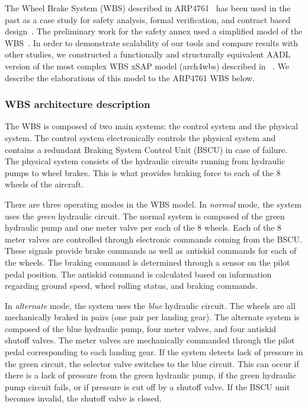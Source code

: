 The Wheel Brake System (WBS) described in ARP4761~\cite{SAE:ARP4761} has been used in the past as a case study for safety analysis, formal verification, and contract based design~\cite{DBLP:conf/cav/BozzanoCPJKPRT15, 10.1007/978-3-319-11936-6-7, CAV2015:BoCiGrMa, Stewart17:IMBSA, Joshi05:SafeComp}. The preliminary work for the safety annex used a simplified model of the WBS~\cite{Stewart17:IMBSA}. In order to demonstrate scalability of our tools and compare results with other studies, we constructed a functionally and structurally equivalent AADL version of %
the most complex WBS xSAP model (arch4wbs) described in %
~\cite{DBLP:conf/cav/BozzanoCPJKPRT15}.  %
We describe the elaborations of this model to the ARP4761 WBS below.

\subsubsection{WBS architecture description}
The WBS is composed of two main systems: the control system and the physical system. The control system electronically controls the physical system and contains a redundant Braking System Control Unit (BSCU) in case of failure. The physical system consists of the hydraulic circuits running from hydraulic pumps to wheel brakes. This is what provides braking force to each of the 8 wheels of the aircraft.

There are three operating modes in the WBS model. In \textit{normal} mode, the system uses the \textit{green} hydraulic circuit. The normal system is composed of the green hydraulic pump and one meter valve per each of the 8 wheels. Each of the 8 meter valves are controlled through electronic commands coming from the BSCU. These signals provide brake commands as well as antiskid commands for each of the wheels. The braking command is determined through a sensor on the pilot pedal position. The antiskid command is calculated based on information regarding ground speed, wheel rolling status, and braking commands.

In \textit{alternate} mode, the system uses the \textit{blue} hydraulic circuit.  The wheels are all mechanically braked in pairs (one pair per landing gear). The alternate system is composed of the blue hydraulic pump, four meter valves, and four antiskid shutoff valves. The meter valves are mechanically commanded through the pilot pedal corresponding to each landing gear. If the system detects lack of pressure in the green circuit, the selector valve switches to the blue circuit. This can occur if there is a lack of pressure from the green hydraulic pump, if the green hydraulic pump circuit fails, or if pressure is cut off by a shutoff valve. If the BSCU unit becomes invalid, the shutoff valve is closed.

